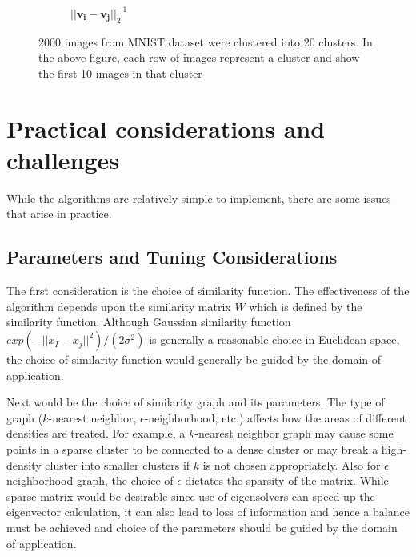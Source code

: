 \documentclass[10pt,a4paper, nocenter]{report}
\newcommand{\norm}[1]{\lvert\lvert {#1} \rvert\rvert}
\begin{document}
\begin{enumerate}
\begin{figure}[h]
\begin{center}
\begin{subfigure}[b]{0.4\textwidth}
                    \caption{$\lvert \lvert \mathbf{v_i} - \mathbf{v_j} \rvert \rvert_2^{-1}$ \vspace{10pt} }
                    \label{fig:clustering_20_2norm}
                \end{subfigure}
            \end{center}
            \caption{2000 images from MNIST dataset were clustered into 20 clusters. In the above figure, each row of images represent a cluster and show the first 10 images in that cluster}
            \label{fig:mnistImages}
        \end{figure}

        
    \end{enumerate}
    
    
    \section{Practical considerations and challenges}

    While the algorithms are relatively simple to implement, there are some issues that arise in practice. 
    
    \subsection{Parameters and Tuning Considerations}
    The first consideration is the choice of similarity function. The effectiveness of the algorithm depends upon the similarity matrix $W$ which is defined by the similarity function. Although Gaussian similarity function $exp(-\norm{x_I - x_j}^2)/(2\sigma^2)$ is generally a reasonable choice in Euclidean space, the choice of similarity function would generally be guided by the domain of application. 

    Next would be the choice of similarity graph and its parameters. The type of graph ($k$-nearest neighbor, $\epsilon$-neighborhood, etc.) affects how the areas of different densities are treated. For example, a $k$-nearest neighbor graph may cause some points in a sparse cluster to be connected to a dense cluster or may break a high-density cluster into smaller clusters if $k$ is not chosen appropriately. Also for $\epsilon$ neighborhood graph, the choice of $\epsilon$ dictates the sparsity of the matrix. While sparse matrix would be desirable since use of eigensolvers can speed up the eigenvector calculation, it can also lead to loss of information and hence a balance must be achieved and choice of the parameters should be guided by the domain of application. 
\end{document}
